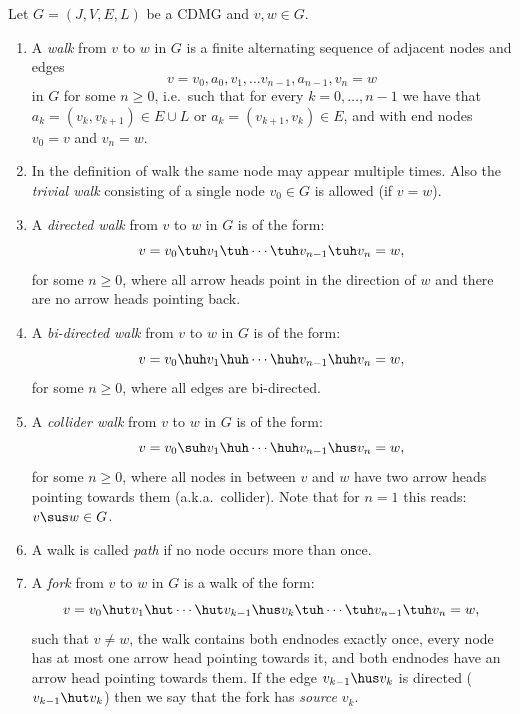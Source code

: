 \begin{Def}[Walks]
     Let $G=(J,V,E,L)$ be a CDMG and $v,w \in G$.
\begin{enumerate}
    \item A \emph{walk} from $v$ to $w$ in $G$ is a finite alternating sequence of adjacent nodes and edges 
      \[v=v_0, a_0, v_1, \dots v_{n-1}, a_{n-1}, v_n=w\] 
        in $G$ for some $n \ge 0$, i.e.\ such that for every $k=0,\dots,n-1$ 
        we have that $a_k = (v_k, v_{k+1}) \in E \cup L$ or $a_k = (v_{k+1}, v_k) \in E$, and with end nodes $v_0=v$ and $v_n=w$.
    \item[] In the definition of walk the same node may appear multiple times.
            Also  the \emph{trivial walk} consisting of a single node $v_0 \in G$ is allowed (if $v=w$).
    \item A \emph{directed walk} from $v$ to $w$ in $G$ is of the form:
        \[v=v_0 \tuh v_1 \tuh  \cdots \tuh v_{n-1} \tuh v_n=w,\]
        for some $n \ge 0$,
        where all arrow heads point in the direction of $w$ and there are no arrow heads pointing back.
    \item A \emph{bi-directed walk} from $v$ to $w$ in $G$ is of the form:
        \[v=v_0 \huh v_1 \huh  \cdots \huh v_{n-1} \huh v_n=w,\]
        for some $n \ge 0$, where all edges are bi-directed.
    \item A \emph{collider walk} from $v$ to $w$ in $G$ is of the form:
        \[v=v_0 \suh v_1 \huh  \cdots \huh v_{n-1} \hus v_n=w,\]
        for some $n \ge 0$, where all nodes in between $v$ and $w$ have two arrow heads pointing towards them (a.k.a.\ collider).
        Note that for $n=1$ this reads: $v\sus w \in G$.
    \item A walk is called \emph{path} if no node occurs more than once.
    \item A \emph{fork} from $v$ to $w$ in $G$ is a walk of the form:
        \[v=v_0 \hut v_1 \hut  \cdots \hut v_{k-1} \hus v_k  \tuh \cdots \tuh v_{n-1} \tuh v_n=w,\]
        such that $v \ne w$, the walk contains both endnodes exactly once, 
        every node has at most one arrow head pointing towards it, and 
        both endnodes have an arrow head pointing towards them. 
          If the edge $v_{k-1} \hus v_k$ is directed ($v_{k-1} \hut v_k$) then we say that the fork has \emph{source} $v_{k}$.
  \end{enumerate}
\end{Def}



